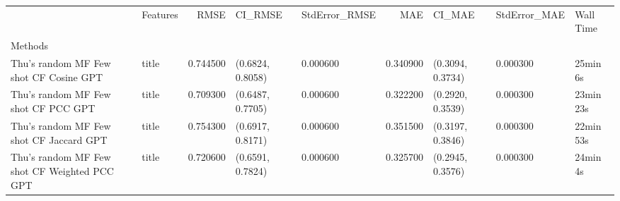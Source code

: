 \begin{tabular}{llrllrlll}
 & Features & RMSE & CI_RMSE & StdError_RMSE & MAE & CI_MAE & StdError_MAE & Wall Time \\
Methods &  &  &  &  &  &  &  &  \\
Thu's random MF Few shot CF Cosine GPT & title & 0.744500 & (0.6824, 0.8058) & 0.000600 & 0.340900 & (0.3094, 0.3734) & 0.000300 & 25min 6s \\
Thu's random MF Few shot CF PCC GPT & title & 0.709300 & (0.6487, 0.7705) & 0.000600 & 0.322200 & (0.2920, 0.3539) & 0.000300 & 23min 23s \\
Thu's random MF Few shot CF Jaccard GPT & title & 0.754300 & (0.6917, 0.8171) & 0.000600 & 0.351500 & (0.3197, 0.3846) & 0.000300 & 22min 53s \\
Thu's random MF Few shot CF Weighted PCC GPT & title & 0.720600 & (0.6591, 0.7824) & 0.000600 & 0.325700 & (0.2945, 0.3576) & 0.000300 & 24min 4s \\
\end{tabular}
